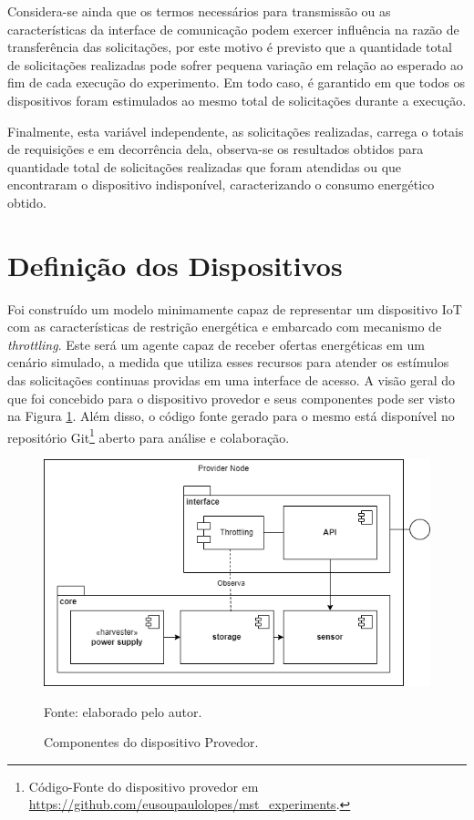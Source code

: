 Considera-se ainda que os termos necessários para transmissão ou as características da interface de comunicação podem exercer influência na razão de transferência das solicitações, por este motivo é previsto que a quantidade total de solicitações realizadas pode sofrer pequena variação em relação ao esperado ao fim de cada execução do experimento. Em todo caso, é garantido em que todos os dispositivos foram estimulados ao mesmo total de solicitações durante a execução.

Finalmente, esta variável independente, as solicitações realizadas, carrega o totais de requisições e em decorrência dela, observa-se os resultados obtidos para  quantidade total de solicitações realizadas que foram atendidas ou que encontraram o dispositivo indisponível, caracterizando o consumo energético obtido.


\section{Definição dos Dispositivos}

Foi construído um modelo minimamente capaz de representar um dispositivo \acs{IoT} com as características de restrição energética e embarcado com mecanismo de \textit{throttling}. Este será um agente capaz de receber ofertas energéticas em um cenário simulado, a medida que utiliza esses recursos para atender os estímulos das solicitações continuas providas em uma interface de acesso. A visão geral do que foi concebido para o dispositivo provedor e seus componentes pode ser visto na Figura \ref{fig:cap6providernode}. Além disso, o código fonte gerado para o mesmo está disponível no repositório Git\footnote{Código-Fonte do dispositivo provedor em \url{https://github.com/eusoupaulolopes/mst_experiments}.} aberto para análise e colaboração.

\begin{figure}[H]
	\centering
	
	\caption{Componentes do dispositivo Provedor.}
	\label{fig:cap6providernode}
	\noindent\includegraphics[width=0.75\linewidth]{Imagens/cap6/cap6providernode.png} 
	
	Fonte: elaborado pelo autor.
\end{figure}

